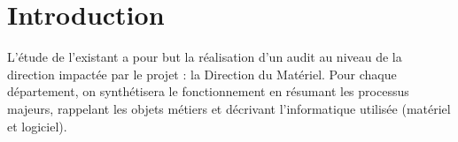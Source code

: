 \section{Introduction}

L'étude de l'existant a pour but la réalisation d'un audit au niveau de la
direction impactée par le projet : la Direction du Matériel. Pour chaque
département, on synthétisera le fonctionnement en résumant les processus
majeurs, rappelant les objets métiers et décrivant l'informatique utilisée
(matériel et logiciel).

